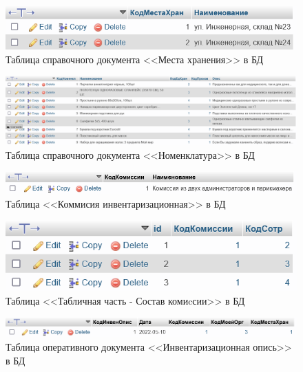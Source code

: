 \documentclass[12pt, a4paper, simple]{eskdtext}
\begin{document}
    \begin{figure}[!h]
        \centering
        \includegraphics[width=12cm]
            {_assets/СП_МестаХран.png}
        \caption{Таблица справочного документа <<Места хранения>> в БД}
        \label{fig:CP_MestaXran}
    \end{figure}

    \begin{figure}[!h]
        \centering
        \includegraphics[width=18cm]
            {_assets/СП_Номенкл.png}
        \caption{Таблица справочного документа <<Номенклатура>> в БД}
        \label{fig:CP_Nomencl}
    \end{figure}

    \begin{figure}[!h]
        \centering
        \includegraphics[width=12cm]
            {_assets/КомИнвент.png}
        \caption{Таблица <<Коммисия инвентаризационная>> в БД}
        \label{fig:CP_KomInvent}
    \end{figure}

    \begin{figure}[!h]
        \centering
        \includegraphics[width=12cm]
            {_assets/ТабличнаяЧасть_СоставКомис.png}
        \caption{Таблица <<Табличная часть - Состав комиcсии>> в БД}
        \label{fig:TablichnajaChast_SostavKomissii}
    \end{figure}

    \begin{figure}[!h]
        \centering
        \includegraphics[width=12cm]
            {_assets/ОП_ИнвенОпис.png}
        \caption{Таблица оперативного документа <<Инвентаризационная опись>> в БД}
        \label{fig:OP_InvenOpis}
    \end{figure}
\end{document}
